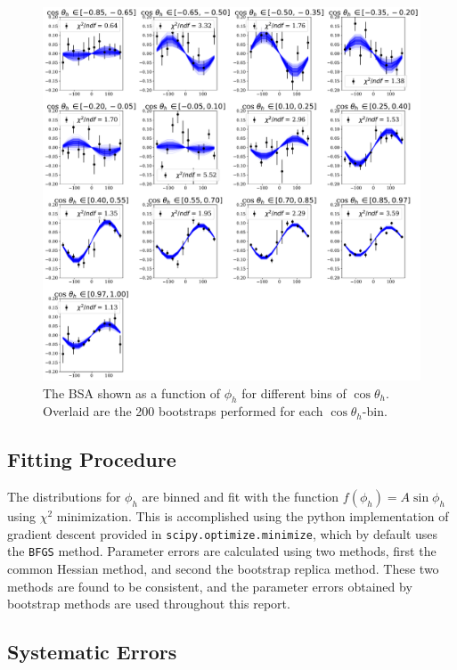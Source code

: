 \begin{figure}
  \begin{center}
    \includegraphics[width=\columnwidth]{image/default_phi_bootstraps.pdf}
    \caption{The BSA shown as a function of $\phi_h$ for different bins of $\cos \theta_h$.  Overlaid are the 200 bootstraps performed for each $\cos \theta_h$-bin.}
  \end{center}
\end{figure}

\subsection{Fitting Procedure}
The distributions for $\phi_h$ are binned and fit with the function $f(\phi_h) = A\sin{\phi_h}$ using $\chi^2$ minimization.  This is accomplished using the python implementation of gradient descent provided in \texttt{scipy.optimize.minimize}, which by default uses the \texttt{BFGS} method.  Parameter errors are calculated using two methods, first the common Hessian method, and second the bootstrap replica method.  These two methods are found to be consistent, and the parameter errors obtained by bootstrap methods are used throughout this report.   
\\    

\subsection{Systematic Errors}

